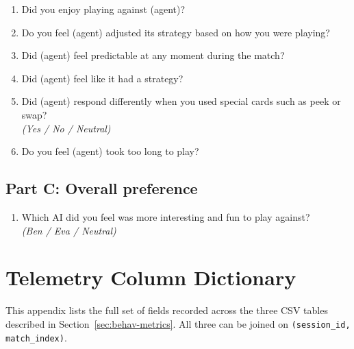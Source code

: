 \documentclass[12pt,a4paper,oneside]{report}
\begin{document}
\begin{appendices}
\begin{enumerate}
  \item Did you enjoy playing against (agent)?
  \item Do you feel (agent) adjusted its strategy based on how you were playing?
  \item Did (agent) feel predictable at any moment during the match?
  \item Did (agent) feel like it had a strategy?
  \item Did (agent) respond differently when you used special cards such as peek or swap?\\
        \emph{(Yes / No / Neutral)}
  \item Do you feel (agent) took too long to play?
\end{enumerate}

\section*{Part C: Overall preference}
\begin{enumerate}
  \item Which AI did you feel was more interesting and fun to play against?\\
        \emph{(Ben / Eva / Neutral)}
\end{enumerate}


\chapter{Telemetry Column Dictionary}
\label{app:telemetry}
This appendix lists the full set of fields recorded across the three CSV tables described in Section~\ref{sec:behav-metrics}. All three can be joined on \texttt{(session\_id, match\_index)}.


\end{appendices}
\end{document}
